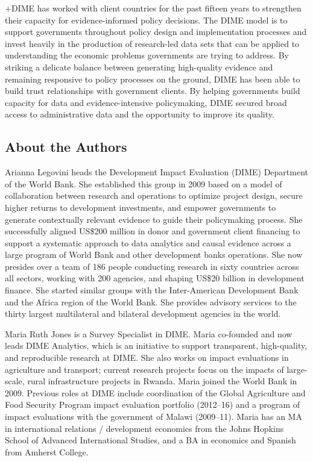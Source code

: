 \documentclass[
]{WileySix}
\begin{document}
+DIME\textbar{} has worked with client countries for the past fifteen years to strengthen their capacity for evidence-informed policy decisions. The DIME model is to support governments throughout policy design and implementation processes and invest heavily in the production of research-led data sets that can be applied to understanding the economic problems governments are trying to address. By striking a delicate balance between generating high-quality evidence and remaining responsive to policy processes on the ground, DIME has been able to build trust relationships with government clients. By helping governments build capacity for data and evidence-intensive policymaking, DIME secured broad access to administrative data and the opportunity to improve its quality.

\hypertarget{about-the-authors-7}{%
\subsection*{About the Authors}\label{about-the-authors-7}}

Arianna Legovini heads the Development Impact Evaluation (DIME) Department of the World Bank. She established this group in 2009 based on a model of collaboration between research and operations to optimize project design, secure higher returns to development investments, and empower governments to generate contextually relevant evidence to guide their policymaking process. She successfully aligned US\$200 million in donor and government client financing to support a systematic approach to data analytics and causal evidence across a large program of World Bank and other development banks operations. She now presides over a team of 186 people conducting research in sixty countries across all sectors, working with 200 agencies, and shaping US\$20 billion in development finance. She started similar groups with the Inter-American Development Bank and the Africa region of the World Bank. She provides advisory services to the thirty largest multilateral and bilateral development agencies in the world.

Maria Ruth Jones is a Survey Specialist in DIME. Maria co-founded and now leads DIME Analytics, which is an initiative to support transparent, high-quality, and reproducible research at DIME. She also works on impact evaluations in agriculture and transport; current research projects focus on the impacts of large-scale, rural infrastructure projects in Rwanda. Maria joined the World Bank in 2009. Previous roles at DIME include coordination of the Global Agriculture and Food Security Program impact evaluation portfolio (2012--16) and a program of impact evaluations with the government of Malawi (2009--11). Maria has an MA in international relations / development economics from the Johns Hopkins School of Advanced International Studies, and a BA in economics and Spanish from Amherst College.
\end{document}
